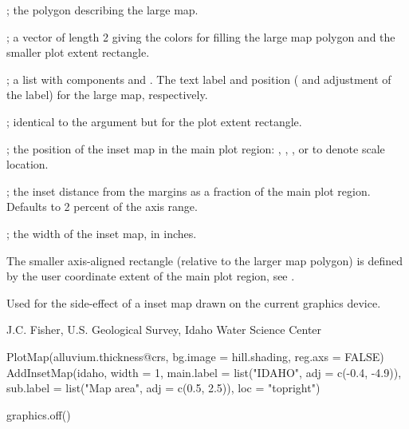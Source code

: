 \documentclass[letterpaper]{book}
\begin{document}
\begin{Arguments}
\begin{ldescription}
\item[\code{p}] ; the polygon describing the large map.
\item[\code{col}] ; a vector of length 2 giving the colors for filling the large map polygon  and the smaller plot extent rectangle.
\item[\code{main.label}] ; a list with components  and .
The text label and position ( and  adjustment of the label) for the large map, respectively.
\item[\code{sub.label}] ; identical to the  argument but for the plot extent rectangle.
\item[\code{loc}] ; the position of the inset map in the main plot region: , , , or  to denote scale location.
\item[\code{inset}] ; the inset distance from the margins as a fraction of the main plot region.
Defaults to 2 percent of the axis range.
\item[\code{width}] ; the width of the inset map, in inches.
\end{ldescription}
\end{Arguments}
%
\begin{Details}\relax
The smaller axis-aligned rectangle (relative to the larger map polygon) is defined by the user coordinate extent of the main plot region, see .
\end{Details}
%
\begin{Value}
Used for the side-effect of a inset map drawn on the current graphics device.
\end{Value}
%
\begin{Author}\relax
J.C. Fisher, U.S. Geological Survey, Idaho Water Science Center
\end{Author}
%
\begin{SeeAlso}\relax
{}
\end{SeeAlso}
%
\begin{Examples}
\begin{ExampleCode}
PlotMap(alluvium.thickness@crs, bg.image = hill.shading, reg.axs = FALSE)
AddInsetMap(idaho, width = 1, main.label = list("IDAHO", adj = c(-0.4, -4.9)),
            sub.label = list("Map area", adj = c(0.5, 2.5)), loc = "topright")

graphics.off()
\end{ExampleCode}
\end{Examples}
\end{document}
